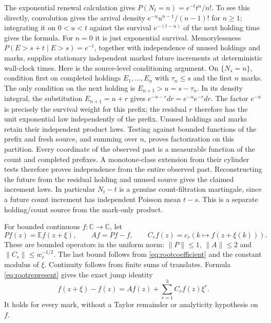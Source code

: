\documentclass[11pt]{article}
\newcommand{\E}{\mathbb E}\newcommand{\Pp}{\mathbb P}
\begin{document}
The exponential renewal calculation gives
$P(N_t=n)=e^{-t}t^n/n!$. To see this directly, convolution gives the
arrival density $e^{-u}u^{n-1}/(n-1)!$ for $n\ge1$; integrating it on
$0<u<t$ against the survival $e^{-(t-u)}$ of the next holding time
gives the formula. For $n=0$ it is just exponential survival.
Memorylessness $P(E>s+t\mid E>s)=e^{-t}$, together with independence
of unused holdings and marks, supplies stationary independent marked
future increments at deterministic wall-clock times. Here is the source-level conditioning argument. On $\{N_s=n\}$,
condition first on completed holdings $E_1,\ldots,E_n$ with
$\tau_n\le s$ and the first $n$ marks. The only condition on the next
holding is $E_{n+1}>u=s-\tau_n$. In its density integral, the substitution
$E_{n+1}=u+r$ gives $e^{-u-r}dr=e^{-u}e^{-r}dr$.
The factor $e^{-u}$ is precisely the survival weight for this prefix;
the residual $r$ therefore has the unit exponential law independently
of the prefix. Unused holdings and marks retain their independent
product laws. Testing against bounded functions of the prefix and
fresh source, and summing over $n$, proves factorization on this
partition. Every coordinate of the observed past is a measurable
function of the count and completed prefixes. A monotone-class
extension from their cylinder tests therefore proves independence
from the entire observed past. Reconstructing the future from the
residual holding and unused source gives the claimed increment laws.
In particular $N_t-t$ is a genuine count-filtration martingale,
since a future count increment has independent Poisson mean $t-s$.
This is a separate holding/count source from the mark-only product.

For bounded continuous $f:\mathbb C\to\mathbb C$, let
\[
 Pf(z)=\E f(z+\xi),\qquad Af=Pf-f,\qquad
 C_rf(z)=c_r(k\mapsto f(z+\xi(k))).
\]
These are bounded operators in the uniform norm:
$\|P\|\le1$, $\|A\|\le2$ and
$\|C_r\|\le w_r^{-1/2}$. The last bound follows from
\eqref{eq:rootcoefficient} and the constant modulus of $\xi$.
Continuity follows from finite sums of translates. Formula
\eqref{eq:rootrepresent} gives the exact jump identity
\begin{equation}\label{eq:jumpchannels}
 f(z+\xi)-f(z)=Af(z)+\sum_{r=1}^3C_rf(z)\xi^r.
\end{equation}
It holds for every mark, without a Taylor remainder or analyticity
hypothesis on $f$.
\end{document}
